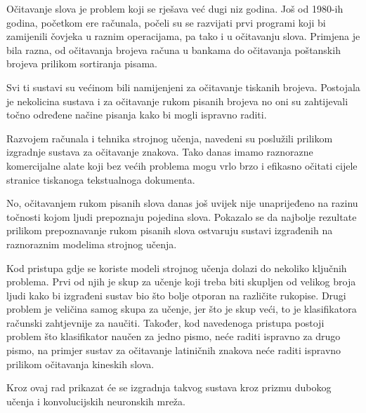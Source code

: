 Očitavanje slova je problem koji se rješava već dugi niz godina. Još od 1980-ih godina, početkom ere računala, počeli su se razvijati prvi programi koji bi zamijenili čovjeka u raznim operacijama, pa tako i u očitavanju slova. Primjena je bila razna, od očitavanja brojeva računa u bankama do očitavanja poštanskih brojeva prilikom sortiranja pisama.

Svi ti sustavi su većinom bili namijenjeni za očitavanje tiskanih brojeva. Postojala je nekolicina sustava i za očitavanje rukom pisanih brojeva no oni su zahtijevali točno određene načine pisanja kako bi mogli ispravno raditi.

Razvojem računala i tehnika strojnog učenja, navedeni su poslužili prilikom izgradnje sustava za očitavanje znakova. Tako danas imamo raznorazne komercijalne alate koji bez većih problema mogu vrlo brzo i efikasno očitati cijele stranice tiskanoga tekstualnoga dokumenta.

No, očitavanjem rukom pisanih slova danas još uvijek nije unaprijeđeno na razinu točnosti kojom ljudi prepoznaju pojedina slova. Pokazalo se da najbolje rezultate prilikom prepoznavanje rukom pisanih slova ostvaruju sustavi izgrađenih na raznoraznim modelima strojnog učenja.

Kod pristupa gdje se koriste modeli strojnog učenja dolazi do nekoliko ključnih problema. Prvi od njih je skup za učenje koji treba biti skupljen od velikog broja ljudi kako bi izgrađeni sustav bio što bolje otporan na različite rukopise. Drugi problem je veličina samog skupa za učenje, jer što je skup veći, to je klasifikatora računski zahtjevnije za naučiti. Također, kod navedenoga pristupa postoji problem što klasifikator naučen za jedno pismo, neće raditi ispravno za drugo pismo, na primjer sustav za očitavanje latiničnih znakova neće raditi ispravno prilikom očitavanja kineskih slova.

Kroz ovaj rad prikazat će se izgradnja takvog sustava kroz prizmu dubokog učenja i konvolucijskih neuronskih mreža.

